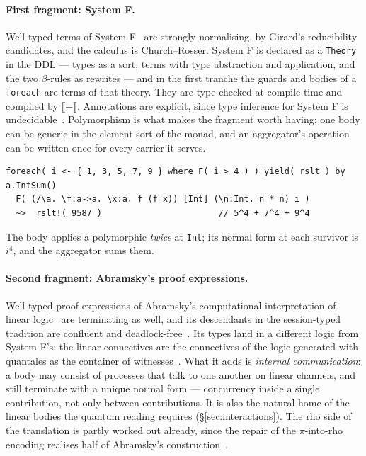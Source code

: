 \documentclass[11pt]{article}
\theoremstyle{branddef}
\theoremstyle{brandplain}
\theoremstyle{brandrem}
\newcommand{\rhoc}{\textsf{rho}}
\newcommand{\sem}[1]{\llbracket #1 \rrbracket}
\newcommand{\fe}{\texttt{foreach}}
\begin{document}
\paragraph{First fragment: System F.} Well-typed terms of System
F~\cite{GirardLafontTaylor89, Reynolds74} are strongly normalising, by Girard's
reducibility candidates, and the calculus is Church--Rosser. System F is
declared as a \texttt{Theory} in the DDL --- types as a sort, terms with type
abstraction and application, and the two \(\beta\)-rules as rewrites --- and in
the first tranche the guards and bodies of a \fe{} are terms of that theory.
They are type-checked at compile time and compiled by \(\sem{-}\). Annotations
are explicit, since type inference for System F is
undecidable~\cite{Wells99}. Polymorphism is what makes the fragment worth
having: one body can be generic in the element sort of the monad, and an
aggregator's operation can be written once for every carrier it serves.
\begin{lstlisting}
foreach( i <- { 1, 3, 5, 7, 9 } where F( i > 4 ) ) yield( rslt ) by a.IntSum()
  F( (/\a. \f:a->a. \x:a. f (f x)) [Int] (\n:Int. n * n) i )
  ~>  rslt!( 9587 )                       // 5^4 + 7^4 + 9^4
\end{lstlisting}
The body applies a polymorphic \emph{twice} at \texttt{Int}; its normal form at
each survivor is \(i^4\), and the aggregator sums them.

\paragraph{Second fragment: Abramsky's proof expressions.} Well-typed proof
expressions of Abramsky's computational interpretation of linear
logic~\cite{Abramsky94} are terminating as well, and its descendants in the
session-typed tradition are confluent and deadlock-free~\cite{CairesPfenning10,
Wadler12}. Its types land in a different logic from System F's: the linear
connectives are the connectives of the logic generated with quantales as the
container of witnesses~\cite{F1R3Dev}. What it adds is \emph{internal
communication}: a body may consist of processes that talk to one another on
linear channels, and still terminate with a unique normal form --- concurrency
inside a single contribution, not only between contributions. It is also the
natural home of the linear bodies the quantum reading requires
(\S\ref{sec:interactions}). The rho side of the translation is partly worked
out already, since the repair of the \(\pi\)-into-\rhoc{} encoding realises half
of Abramsky's construction~\cite{Namespaces}.
\end{document}
